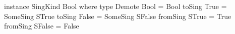 \begin{code}
instance SingKind Bool where
  type Demote Bool = Bool
  toSing True  = SomeSing STrue
  toSing False = SomeSing SFalse
  fromSing STrue  = True
  fromSing SFalse = False
\end{code}
